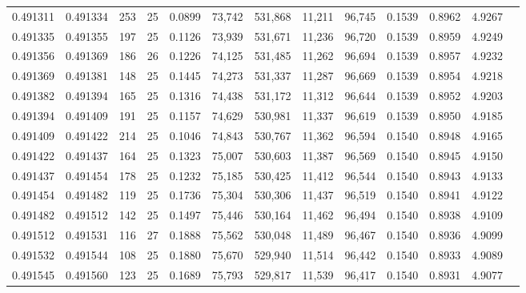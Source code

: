 \begin{tabular}{rrrrrrrrrrrrr}
0.491311 & 0.491334 & 253 &  25 &                                     0.0899 &  73,742 & 531,868 &  11,211 &  96,745 & 0.1539 & 0.8962 & 4.9267 \\
0.491335 & 0.491355 & 197 &  25 &                                     0.1126 &  73,939 & 531,671 &  11,236 &  96,720 & 0.1539 & 0.8959 & 4.9249 \\
0.491356 & 0.491369 & 186 &  26 &                                     0.1226 &  74,125 & 531,485 &  11,262 &  96,694 & 0.1539 & 0.8957 & 4.9232 \\
0.491369 & 0.491381 & 148 &  25 &                                     0.1445 &  74,273 & 531,337 &  11,287 &  96,669 & 0.1539 & 0.8954 & 4.9218 \\
0.491382 & 0.491394 & 165 &  25 &                                     0.1316 &  74,438 & 531,172 &  11,312 &  96,644 & 0.1539 & 0.8952 & 4.9203 \\
0.491394 & 0.491409 & 191 &  25 &                                     0.1157 &  74,629 & 530,981 &  11,337 &  96,619 & 0.1539 & 0.8950 & 4.9185 \\
0.491409 & 0.491422 & 214 &  25 &                                     0.1046 &  74,843 & 530,767 &  11,362 &  96,594 & 0.1540 & 0.8948 & 4.9165 \\
0.491422 & 0.491437 & 164 &  25 &                                     0.1323 &  75,007 & 530,603 &  11,387 &  96,569 & 0.1540 & 0.8945 & 4.9150 \\
0.491437 & 0.491454 & 178 &  25 &                                     0.1232 &  75,185 & 530,425 &  11,412 &  96,544 & 0.1540 & 0.8943 & 4.9133 \\
0.491454 & 0.491482 & 119 &  25 &                                     0.1736 &  75,304 & 530,306 &  11,437 &  96,519 & 0.1540 & 0.8941 & 4.9122 \\
0.491482 & 0.491512 & 142 &  25 &                                     0.1497 &  75,446 & 530,164 &  11,462 &  96,494 & 0.1540 & 0.8938 & 4.9109 \\
0.491512 & 0.491531 & 116 &  27 &                                     0.1888 &  75,562 & 530,048 &  11,489 &  96,467 & 0.1540 & 0.8936 & 4.9099 \\
0.491532 & 0.491544 & 108 &  25 &                                     0.1880 &  75,670 & 529,940 &  11,514 &  96,442 & 0.1540 & 0.8933 & 4.9089 \\
0.491545 & 0.491560 & 123 &  25 &                                     0.1689 &  75,793 & 529,817 &  11,539 &  96,417 & 0.1540 & 0.8931 & 4.9077 \\

\end{tabular}

